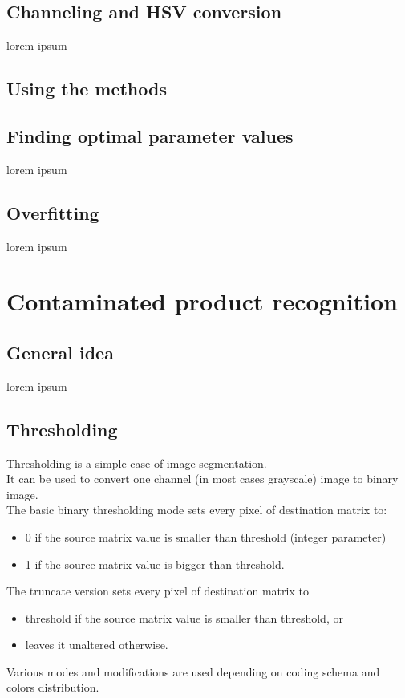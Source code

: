 \documentclass[12pt,twoside,a4paper]{article}
\begin{document}
  


\subsection{Channeling and HSV conversion}
lorem ipsum
\subsection{Using the methods}


\subsection{Finding optimal parameter values}
lorem ipsum
\subsection{Overfitting}
lorem ipsum
\section{Contaminated product recognition}
\subsection{General idea}
lorem ipsum
\subsection{Thresholding}

Thresholding is a simple case of image segmentation.\\
It can be used to convert one channel (in most cases grayscale) image to binary image.\\
The basic binary thresholding mode sets every pixel of destination matrix to:
\begin{itemize}
\item 0 if the source matrix value is smaller than threshold (integer parameter)
\item 1 if the source matrix value is bigger than threshold.
\end{itemize}
The truncate version sets every pixel of destination matrix to
\begin{itemize}
\item threshold if the source matrix value is smaller than threshold, or
\item leaves it unaltered otherwise.
\end{itemize}
Various modes and modifications are used depending on coding schema and colors distribution.
  
\end{document}
